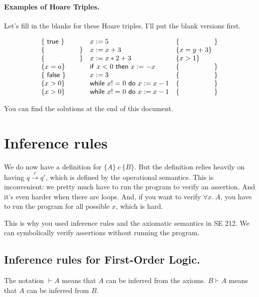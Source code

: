 \documentclass[11pt]{article}
\begin{document}
\paragraph{Examples of Hoare Triples.} Let's fill in the blanks for these Hoare triples. I'll put the blank versions first.

\[
\begin{array}{lll}
  \{ \mathsf{~true~} \} & x := 5 &\{ \hspace*{5em} \} \\
  \{ \hspace*{5em} \} & x := x + 3 &\{ x = y + 3 \} \\
  \{ \hspace*{5em} \} & x := x * 2 + 3 &\{ x > 1 \} \\
  \{ x = a \} & \mathsf{if~} x < 0 \mathsf{~then~} x := -x  &\{ \hspace*{5em} \} \\
  \{ \mathsf{~false~} \} & x := 3  &\{ \hspace*{5em} \} \\
  \{ x > 0 \} & \mathsf{while~} x \mathtt{!=~} 0 \mathsf{~do~} x := x - 1  &\{ \hspace*{5em} \} \\
  \{ x > 0 \} & \mathsf{while~} x \mathtt{!=~} 0 \mathsf{~do~} x := x - 1 & \{ \hspace*{5em} \} \\
\end{array}
\]

You can find the solutions at the end of this document.

\section*{Inference rules}

We do now have a definition for $\{A\} ~c~ \{B\}$. But the definition
relies heavily on having $q \xrightarrow{c} q'$, which is defined by
the operational semantics. This is inconvenient: we pretty much have
to run the program to verify an assertion. And it's even harder when
there are loops.  And, if you want to verify $\forall x.~A$, you have
to run the program for all possible $x$, which is hard.

This is why you used inference rules and the axiomatic semantics in SE 212.
We can symbolically verify assertions without running the program.

\subsection*{Inference rules for First-Order Logic.} The notation $\vdash A$ means that
$A$ can be inferred from the axioms. $B \vdash A$ means that $A$ can be inferred from $B$.
\end{document}
